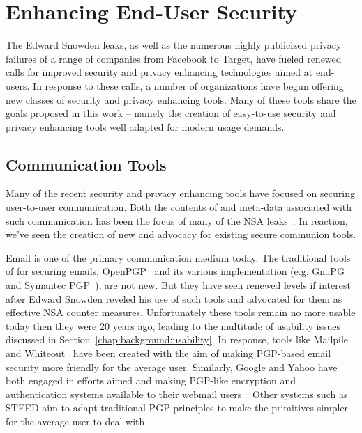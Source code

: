 \section{Enhancing End-User Security}

The Edward Snowden leaks, as well as the numerous highly publicized
privacy failures of a range of companies from Facebook to Target, have
fueled renewed calls for improved security and privacy enhancing
technologies aimed at end-users. In response to these calls, a number
of organizations have begun offering new classes of security and privacy
enhancing tools. Many of these tools share the goals proposed in this
work -- namely the creation of easy-to-use security and privacy enhancing
tools well adapted for modern usage demands.

\subsection{Communication Tools}

Many of the recent security and privacy enhancing tools have focused
on securing user-to-user communication. Both the contents of and
meta-data associated with such communication has been the focus of
many of the NSA leaks~\cite{schneier-metadata}. In reaction, we've
seen the creation of new and advocacy for existing secure communion
tools.

Email is one of the primary communication medium today. The
traditional tools of for securing emails, OpenPGP~\cite{openpgp} and
its various implementation (e.g. GnuPG~\cite{gnupg} and Symantec
PGP~\cite{pgp}), are not new. But they have seen renewed levels if
interest after Edward Snowden reveled his use of such tools and
advocated for them as effective NSA counter measures. Unfortunately
these tools remain no more usable today then they were 20 years ago,
leading to the multitude of usability issues discussed in
Section~\ref{chap:background:usability}. In response, tools like
Mailpile~\cite{mailpile} and Whiteout~\cite{whiteout} have been
created with the aim of making PGP-based email security more friendly
for the average user. Similarly, Google and Yahoo have both engaged in
efforts aimed and making PGP-like encryption and authentication
systems available to their webmail users~\cite{google-endtoend,
  yahoo-endtoend}. Other systems such as STEED aim to adapt
traditional PGP principles to make the primitives simpler for the
average user to deal with~\cite{koch2011}.

